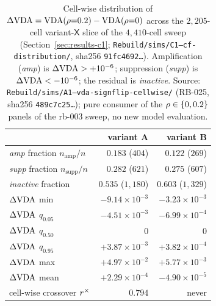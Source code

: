\begin{table}[!t]
  \centering
  \caption{Cell-wise distribution of
  $\Delta\mathrm{VDA} = \mathrm{VDA}(\rho{=}0.2) - \mathrm{VDA}(\rho{=}0)$ across the
  $2{,}205$-cell variant-$\mathsf{X}$ slice of the
  $4{,}410$-cell sweep
  (Section~\ref{sec:results-c1};
  \texttt{Rebuild/sims/C1--cf-distribution/}, sha256
  \texttt{91fc4692\ldots}). Amplification (\textit{amp}) is
  $\Delta\mathrm{VDA} > +10^{-6}$; suppression (\textit{supp}) is
  $\Delta\mathrm{VDA} < -10^{-6}$; the residual is \textit{inactive}.
  Source: \texttt{Rebuild/sims/A1--vda-signflip-cellwise/}
  (RB-025, sha256 \texttt{489c7c25\ldots}); pure consumer of
  the $\rho \in \{0, 0.2\}$ panels of the rb-003 sweep, no new
  model evaluation.}
  \label{tab:a1cw-summary}
  \begin{tabular}{lrr}
    \hline
                                              & variant A           & variant B           \\
    \hline
    \textit{amp} fraction $n_{\mathrm{amp}}/n$ & $0.183$ ($404$)     & $0.122$ ($269$)     \\
    \textit{supp} fraction $n_{\mathrm{supp}}/n$ & $0.282$ ($621$)   & $0.275$ ($607$)     \\
    \textit{inactive} fraction                & $0.535$ ($1{,}180$) & $0.603$ ($1{,}329$) \\
    $\Delta\mathrm{VDA}$ min                          & $-9.14 \times 10^{-3}$ & $-3.23 \times 10^{-3}$ \\
    $\Delta\mathrm{VDA}$ $q_{0.05}$                    & $-4.51 \times 10^{-3}$ & $-6.99 \times 10^{-4}$ \\
    $\Delta\mathrm{VDA}$ $q_{0.50}$                    & $0$                  & $0$                  \\
    $\Delta\mathrm{VDA}$ $q_{0.95}$                    & $+3.87 \times 10^{-3}$ & $+3.82 \times 10^{-4}$ \\
    $\Delta\mathrm{VDA}$ max                          & $+4.97 \times 10^{-2}$ & $+5.77 \times 10^{-3}$ \\
    $\Delta\mathrm{VDA}$ mean                         & $+2.29 \times 10^{-4}$ & $-4.90 \times 10^{-5}$ \\
    cell-wise crossover $r^{\times}$     & $0.794$              & never                \\
    \hline
  \end{tabular}
\end{table}

